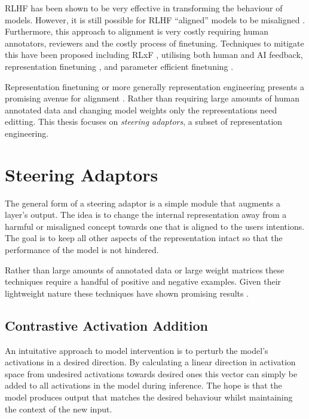 RLHF has been shown to be very effective in transforming the behaviour of models.
However, it is still possible for RLHF ``aligned'' models to be misaligned \citep{misgeneralization, c.ai}.
Furthermore, this approach to alignment is very costly requiring human annotators, reviewers and the costly process of finetuning.
Techniques to mitigate this have been proposed including RLxF \citep{alignment-survey}, utilising both human and AI feedback, representation finetuning \citep{reft}, and parameter efficient finetuning \citep{peft}.

Representation finetuning or more generally representation engineering \citep{steering-taxonomy} presents a promising avenue for alignment \citep{steering-clear, steering-theory, steering-taxonomy}.
Rather than requiring large amounts of human annotated data and changing model weights only the representations need editting.
This thesis focuses on \emph{steering adaptors}, a subset of representation engineering.

\section{Steering Adaptors}

The general form of a steering adaptor is a simple module that augments a layer's output.
The idea is to change the internal representation away from a harmful or misaligned concept towards one that is aligned to the users intentions.
The goal is to keep all other aspects of the representation intact so that the performance of the model is not hindered.

Rather than large amounts of annotated data or large weight matrices these techniques require a handful of positive and negative examples.
Given their lightweight nature these techniques have shown promising results \citep{steering-taxonomy, steering-theory, steering-clear, reft}.

\subsection{Contrastive Activation Addition}
\label{caa}

An intuitative approach to model intervention is to perturb the model's activations in a desired direction.
By calculating a linear direction in activation space from undesired activations towards desired ones this vector can simply be added to all activations in the model during inference.
The hope is that the model produces output that matches the desired behaviour whilst maintaining the context of the new input.

